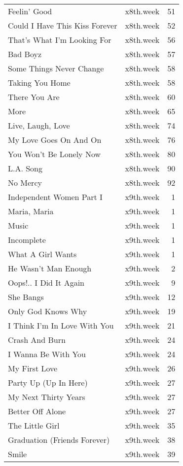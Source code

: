 \begin{table}[ht]
\begin{tabular}{llr}
  Feelin' Good & x8th.week &  51 \\ 
  Could I Have This Kiss Forever & x8th.week &  52 \\ 
  That's What I'm Looking For & x8th.week &  56 \\ 
  Bad Boyz & x8th.week &  57 \\ 
  Some Things Never Change & x8th.week &  58 \\ 
  Taking You Home & x8th.week &  58 \\ 
  There You Are & x8th.week &  60 \\ 
  More & x8th.week &  65 \\ 
  Live, Laugh, Love & x8th.week &  74 \\ 
  My Love Goes On And On & x8th.week &  76 \\ 
  You Won't Be Lonely Now & x8th.week &  80 \\ 
  L.A. Song & x8th.week &  90 \\ 
  No Mercy & x8th.week &  92 \\ 
  Independent Women Part I & x9th.week &   1 \\ 
  Maria, Maria & x9th.week &   1 \\ 
  Music & x9th.week &   1 \\ 
  Incomplete & x9th.week &   1 \\ 
  What A Girl Wants & x9th.week &   1 \\ 
  He Wasn't Man Enough & x9th.week &   2 \\ 
  Oops!.. I Did It Again & x9th.week &   9 \\ 
  She Bangs & x9th.week &  12 \\ 
  Only God Knows Why & x9th.week &  19 \\ 
  I Think I'm In Love With You & x9th.week &  21 \\ 
  Crash And Burn & x9th.week &  24 \\ 
  I Wanna Be With You & x9th.week &  24 \\ 
  My First Love & x9th.week &  26 \\ 
  Party Up (Up In Here) & x9th.week &  27 \\ 
  My Next Thirty Years & x9th.week &  27 \\ 
  Better Off Alone & x9th.week &  27 \\ 
  The Little Girl & x9th.week &  35 \\ 
  Graduation (Friends Forever) & x9th.week &  38 \\ 
  Smile & x9th.week &  39 \\ 

\end{tabular}
\end{table}

